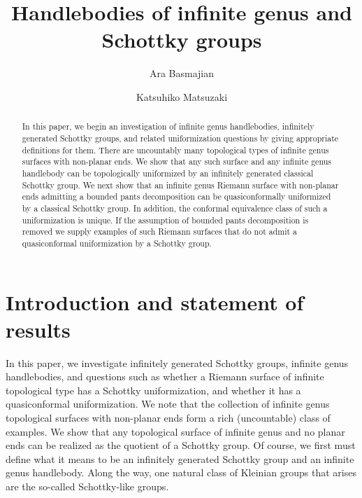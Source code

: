 \documentclass[12pt]{amsart}
\title{Handlebodies  of infinite genus and  Schottky groups}
\author{Ara Basmajian}
\author{Katsuhiko Matsuzaki}
\theoremstyle{plain}
\begin{document}
\begin{abstract}
In this paper, we begin an investigation of infinite genus handlebodies, infinitely generated Schottky groups, and related uniformization questions by giving appropriate definitions for them. There are uncountably many topological types of infinite genus surfaces with non-planar ends. We show that any such surface and 
any infinite genus handlebody can be topologically uniformized by an infinitely generated classical Schottky group. 
We next show that an infinite genus Riemann surface with non-planar ends admitting a bounded pants decomposition can be 
quasiconformally uniformized by a classical Schottky group. In addition, the conformal  equivalence class of 
such a uniformization is unique.
If the assumption of bounded pants decomposition is removed we supply examples of such Riemann surfaces that do not admit 
a quasiconformal uniformization by a Schottky group. 
\end{abstract}

\maketitle



\section{Introduction and statement of results} 
\label{sec: intro}
  In this paper, we investigate infinitely generated Schottky groups, infinite genus handlebodies, and questions such as whether a Riemann surface of infinite topological type has a  Schottky uniformization, and whether 
it has a quasiconformal uniformization. We note that the collection of infinite genus topological surfaces with non-planar ends form a rich (uncountable) class of examples. We show that any topological surface of infinite genus and no planar ends can be realized as the quotient of a Schottky group. 
Of course,  we first must define what it means to be an infinitely generated Schottky group and an infinite genus handlebody.  Along the way, one natural class of Kleinian groups that arises are the so-called 
Schottky-like groups. 
\end{document}
